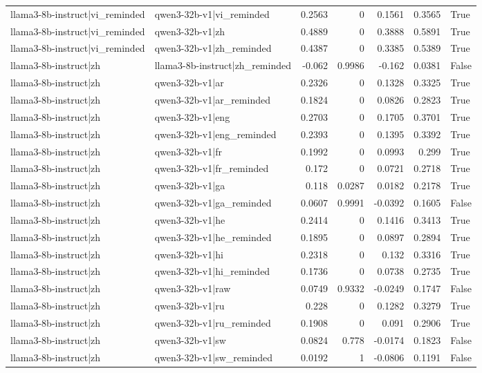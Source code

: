 \begin{table}
\begin{tabular}{l l r r r r l}
llama3-8b-instruct|vi_reminded & qwen3-32b-v1|vi_reminded & 0.2563 & 0 & 0.1561 & 0.3565 & True \\
llama3-8b-instruct|vi_reminded & qwen3-32b-v1|zh & 0.4889 & 0 & 0.3888 & 0.5891 & True \\
llama3-8b-instruct|vi_reminded & qwen3-32b-v1|zh_reminded & 0.4387 & 0 & 0.3385 & 0.5389 & True \\
llama3-8b-instruct|zh & llama3-8b-instruct|zh_reminded & -0.062 & 0.9986 & -0.162 & 0.0381 & False \\
llama3-8b-instruct|zh & qwen3-32b-v1|ar & 0.2326 & 0 & 0.1328 & 0.3325 & True \\
llama3-8b-instruct|zh & qwen3-32b-v1|ar_reminded & 0.1824 & 0 & 0.0826 & 0.2823 & True \\
llama3-8b-instruct|zh & qwen3-32b-v1|eng & 0.2703 & 0 & 0.1705 & 0.3701 & True \\
llama3-8b-instruct|zh & qwen3-32b-v1|eng_reminded & 0.2393 & 0 & 0.1395 & 0.3392 & True \\
llama3-8b-instruct|zh & qwen3-32b-v1|fr & 0.1992 & 0 & 0.0993 & 0.299 & True \\
llama3-8b-instruct|zh & qwen3-32b-v1|fr_reminded & 0.172 & 0 & 0.0721 & 0.2718 & True \\
llama3-8b-instruct|zh & qwen3-32b-v1|ga & 0.118 & 0.0287 & 0.0182 & 0.2178 & True \\
llama3-8b-instruct|zh & qwen3-32b-v1|ga_reminded & 0.0607 & 0.9991 & -0.0392 & 0.1605 & False \\
llama3-8b-instruct|zh & qwen3-32b-v1|he & 0.2414 & 0 & 0.1416 & 0.3413 & True \\
llama3-8b-instruct|zh & qwen3-32b-v1|he_reminded & 0.1895 & 0 & 0.0897 & 0.2894 & True \\
llama3-8b-instruct|zh & qwen3-32b-v1|hi & 0.2318 & 0 & 0.132 & 0.3316 & True \\
llama3-8b-instruct|zh & qwen3-32b-v1|hi_reminded & 0.1736 & 0 & 0.0738 & 0.2735 & True \\
llama3-8b-instruct|zh & qwen3-32b-v1|raw & 0.0749 & 0.9332 & -0.0249 & 0.1747 & False \\
llama3-8b-instruct|zh & qwen3-32b-v1|ru & 0.228 & 0 & 0.1282 & 0.3279 & True \\
llama3-8b-instruct|zh & qwen3-32b-v1|ru_reminded & 0.1908 & 0 & 0.091 & 0.2906 & True \\
llama3-8b-instruct|zh & qwen3-32b-v1|sw & 0.0824 & 0.778 & -0.0174 & 0.1823 & False \\
llama3-8b-instruct|zh & qwen3-32b-v1|sw_reminded & 0.0192 & 1 & -0.0806 & 0.1191 & False \\

\end{tabular}
\end{table}

